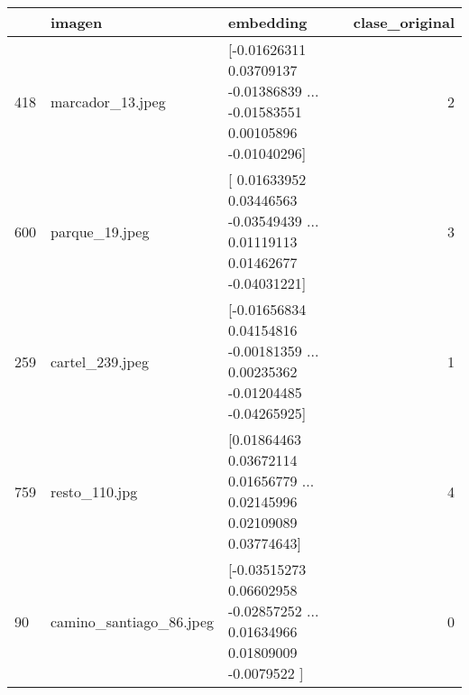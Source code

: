 \begin{tabular}{lllr}
\toprule
 & imagen & embedding & clase\_original \\
\midrule
418 & marcador\_13.jpeg & [-0.01626311  0.03709137 -0.01386839 ... -0.01583551  0.00105896
 -0.01040296] & 2 \\
600 & parque\_19.jpeg & [ 0.01633952  0.03446563 -0.03549439 ...  0.01119113  0.01462677
 -0.04031221] & 3 \\
259 & cartel\_239.jpeg & [-0.01656834  0.04154816 -0.00181359 ...  0.00235362 -0.01204485
 -0.04265925] & 1 \\
759 & resto\_110.jpg & [0.01864463 0.03672114 0.01656779 ... 0.02145996 0.02109089 0.03774643] & 4 \\
90 & camino\_santiago\_86.jpeg & [-0.03515273  0.06602958 -0.02857252 ...  0.01634966  0.01809009
 -0.0079522 ] & 0 \\
\bottomrule
\end{tabular}
